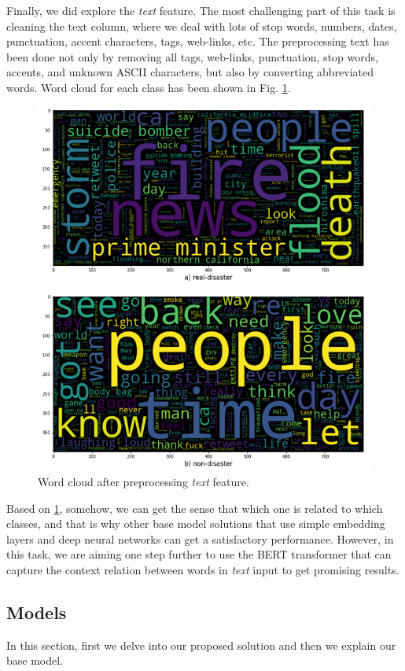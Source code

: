 \documentclass[sigconf]{acmart}
\begin{document}
Finally, we did explore the \textit{text} feature. The most challenging part of this task is cleaning the text column, where we deal with lots of stop words, numbers, dates, punctuation, accent characters, tags, web-links, etc. The preprocessing text has been done not only by removing all tags, web-links, punctuation, stop words, accents, and unknown ASCII characters, but also by converting abbreviated words. Word cloud for each class has been shown in Fig. \ref{fig:wordcloud}.
\begin{figure}[h]
  \centering
  \includegraphics[width=\linewidth]{wordcloud.png}
  \caption{Word cloud after preprocessing \textit{text} feature.}
  \label{fig:wordcloud}
\end{figure}

Based on \ref{fig:wordcloud}, somehow, we can get the sense that which one is related to which classes, and that is why other base model solutions that use simple embedding layers and deep neural networks can get a satisfactory performance. However, in this task, we are aiming one step further to use the BERT transformer that can capture the context relation between words in \textit{text} input to get promising results.

\subsection{Models}
In this section, first we delve into our proposed solution and then we explain our base model. 
\end{document}
